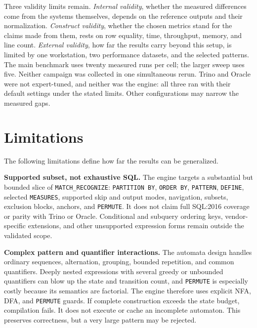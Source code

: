 Three validity limits remain.  \emph{Internal validity}, whether the
measured differences come from the systems themselves, depends on the
reference outputs and their normalization.  \emph{Construct validity},
whether the chosen metrics stand for the claims made from them, rests
on row equality, time, throughput, memory, and line count.
\emph{External validity}, how far the results carry beyond this setup,
is limited by one workstation, two performance datasets, and the
selected patterns.
The main benchmark uses twenty measured runs per cell; the larger
sweep uses five.  Neither campaign was collected in one simultaneous
rerun.  Trino and
Oracle were not expert-tuned, and neither was the engine: all three ran
with their default settings under the stated limits.  Other
configurations may narrow the measured gaps.

\section{Limitations}
\label{sec:conc-limitations}

The following limitations define how far the results can be
generalized.

\textbf{Supported subset, not exhaustive SQL.}
The engine targets a substantial but bounded slice of
\texttt{MATCH\_RECOGNIZE}: \texttt{PARTITION BY},
\texttt{ORDER BY}, \texttt{PATTERN}, \texttt{DEFINE}, selected
\texttt{MEASURES}, supported skip and output modes, navigation,
subsets, exclusion blocks, anchors, and \texttt{PERMUTE}.  It does not
claim full SQL:2016 coverage or parity with Trino or Oracle.
Conditional and subquery ordering keys, vendor-specific extensions, and
other unsupported expression forms remain outside the validated scope.

\textbf{Complex pattern and quantifier interactions.}
The automata design handles ordinary sequences, alternation, grouping,
bounded repetition, and common quantifiers.  Deeply nested expressions
with several greedy or unbounded quantifiers can blow up the state and
transition count, and \texttt{PERMUTE} is especially costly because its
semantics are factorial.  The engine therefore uses explicit NFA,
DFA, and \texttt{PERMUTE} guards.  If complete construction exceeds the
state budget, compilation fails.  It does not execute or cache an incomplete
automaton.  This preserves correctness, but a very large pattern may be
rejected.

